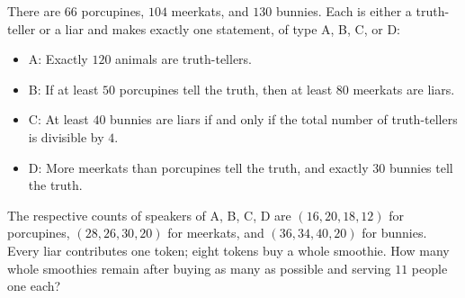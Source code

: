 There are $66$ porcupines, $104$ meerkats, and $130$ bunnies. Each is either a truth-teller or a liar and makes exactly one statement, of type A, B, C, or D:
\begin{itemize}
\item A: Exactly $120$ animals are truth-tellers.
\item B: If at least $50$ porcupines tell the truth, then at least $80$ meerkats are liars.
\item C: At least $40$ bunnies are liars if and only if the total number of truth-tellers is divisible by $4$.
\item D: More meerkats than porcupines tell the truth, and exactly $30$ bunnies tell the truth.
\end{itemize}
The respective counts of speakers of A, B, C, D are $(16,20,18,12)$ for porcupines, $(28,26,30,20)$ for meerkats, and $(36,34,40,20)$ for bunnies. Every liar contributes one token; eight tokens buy a whole smoothie. How many whole smoothies remain after buying as many as possible and serving $11$ people one each?
